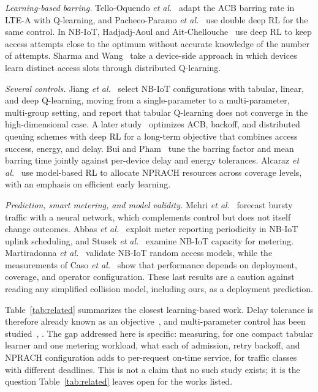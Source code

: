 \documentclass[conference]{IEEEtran}
\begin{document}
\emph{Learning-based barring.} Tello-Oquendo \emph{et al.}~\cite{tello} adapt the
ACB barring rate in LTE-A with Q-learning, and Pacheco-Paramo
\emph{et al.}~\cite{pacheco} use double deep RL for the same control. In NB-IoT,
Hadjadj-Aoul and Ait-Chellouche~\cite{hadjadj} use deep RL to keep access attempts
close to the optimum without accurate knowledge of the number of attempts. Sharma
and Wang~\cite{sharma} take a device-side approach in which devices learn distinct
access slots through distributed Q-learning.

\emph{Several controls.} Jiang \emph{et al.}~\cite{jiang19} select NB-IoT
configurations with tabular, linear, and deep Q-learning, moving from a
single-parameter to a multi-parameter, multi-group setting, and report that
tabular Q-learning does not converge in the high-dimensional case. A later
study~\cite{jiang21} optimizes ACB, backoff, and distributed queuing schemes with
deep RL for a long-term objective that combines access success, energy, and
delay. Bui and Pham~\cite{bui} tune the barring factor and mean barring time
jointly against per-device delay and energy tolerances. Alcaraz
\emph{et al.}~\cite{alcaraz} use model-based RL to allocate NPRACH resources
across coverage levels, with an emphasis on efficient early learning.

\emph{Prediction, smart metering, and model validity.} Mehri
\emph{et al.}~\cite{mehri} forecast bursty traffic with a neural network, which
complements control but does not itself change outcomes. Abbas
\emph{et al.}~\cite{abbas} exploit meter reporting periodicity in NB-IoT uplink
scheduling, and Stusek \emph{et al.}~\cite{stusek} examine NB-IoT capacity for
metering. Martiradonna \emph{et al.}~\cite{martiradonna} validate NB-IoT random
access models, while the measurements of Caso \emph{et al.}~\cite{caso} show that
performance depends on deployment, coverage, and operator configuration. These
last results are a caution against reading any simplified collision model,
including ours, as a deployment prediction.

Table~\ref{tab:related} summarizes the closest learning-based work. Delay tolerance
is therefore already known as an objective~\cite{bui}, and multi-parameter
control has been studied~\cite{jiang19}, \cite{jiang21}. The gap addressed here is
specific: measuring, for one compact tabular learner and one metering workload,
what each of admission, retry backoff, and NPRACH configuration adds to
per-request on-time service, for traffic classes with different deadlines. This
is not a claim that no such study exists; it is the question Table~\ref{tab:related}
leaves open for the works listed.
\end{document}
